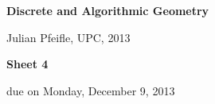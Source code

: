 \documentclass[11pt]{amsart}
\begin{document}
\begin{center}
\textbf{\sffamily
   Discrete and Algorithmic Geometry }

\medskip
   Julian Pfeifle,
   UPC, 2013 \mbox{}
\end{center}

\bigskip

\begin{center}
  \textbf{\sffamily Sheet 4}

\bigskip
 due on Monday, December 9, 2013

\end{center}

\bigskip



\end{document}
